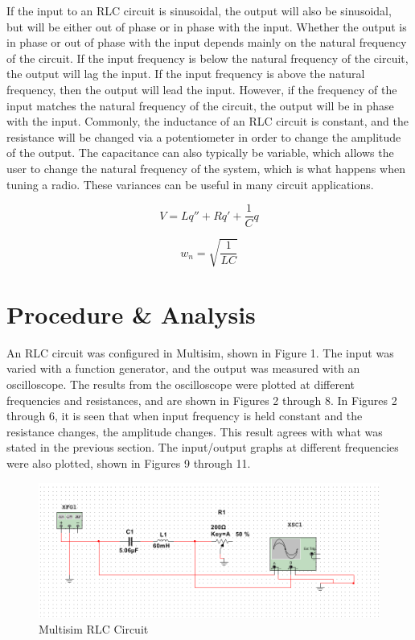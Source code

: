 \documentclass[12pt]{article}
\begin{document}
If the input to an RLC circuit is sinusoidal, the output will also be sinusoidal, but will be either out of phase or in phase with the input. Whether the output is in phase or out of phase with the input depends mainly on the natural frequency of the circuit. If the input frequency is below the natural frequency of the circuit, the output will lag the input. If the input frequency is above the natural frequency, then the output will lead the input. However, if the frequency of the input matches the natural frequency of the circuit, the output will be in phase with the input. Commonly, the inductance of an RLC circuit is constant, and the resistance will be changed via a potentiometer in order to change the amplitude of the output. The capacitance can also typically be variable, which allows the user to change the natural frequency of the system, which is what happens when tuning a radio. These variances can be useful in many circuit applications.
\bigskip
 
 \begin{equation}
V = Lq'' + Rq' + \frac{1}{C}q
 \end{equation}
 \bigskip

\begin{equation}
w_{n} = \sqrt{\frac{1}{LC}}
\end{equation}

\newpage

\section*{\fontsize{12}{12}\selectfont \large Procedure \& Analysis}
An RLC circuit was configured in Multisim, shown in Figure 1. The input was varied with a function generator, and the output was measured with an oscilloscope. The results from the oscilloscope were plotted at different frequencies and resistances, and are shown in Figures 2 through 8. In Figures 2 through 6, it is seen that when input frequency is held constant and the resistance changes, the amplitude changes. This result agrees with what was stated in the previous section. The input/output graphs at different frequencies were also plotted, shown in Figures 9 through 11.
\bigskip

\begin{figure}[h!] %
   \centering
   \includegraphics[width=5.5in]{Oscilloscope_Circuit.PNG} 
   \caption{Multisim RLC Circuit}
   \label{fig:example}
\end{figure}
\bigskip
\end{document}
